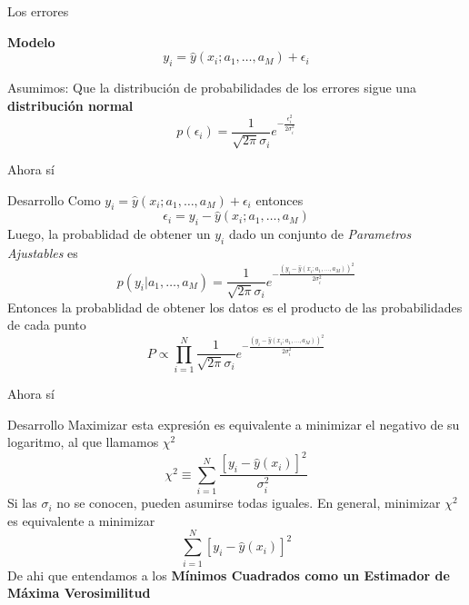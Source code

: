 \documentclass[11pt]{beamer}
\begin{document}
\begin{frame}{Los errores}

\begin{block}{\textbf{Modelo}}
\begin{equation}
y_i = \hat{y}(x_i;a_1,\dots,a_M) + \epsilon_i
\end{equation}
\end{block}
\begin{block}{Asumimos:}
Que la distribución de probabilidades de los errores sigue una \textbf{distribución normal}
\begin{equation}
p(\epsilon_i)=\frac{1}{\sqrt{2\pi}\sigma_i}e^{-\frac{\epsilon_i^2}{2\sigma_i^2}}
\end{equation}
\end{block}

\end{frame}

\begin{frame}{Ahora sí}
\begin{block}{Desarrollo}
Como $y_i = \hat{y}(x_i;a_1,\dots,a_M) + \epsilon_i$ entonces 
$$\epsilon_i = y_i - \hat{y}(x_i;a_1,\dots,a_M)$$
Luego, la probablidad de obtener un $y_i$ dado un conjunto de \textit{Parametros Ajustables} es 
$$ p(y_i|a_1,\dots,a_M)=\frac{1}{\sqrt{2\pi}\sigma_i}e^{-\frac{(y_i - \hat{y}(x_i;a_1,\dots,a_M))^2}{2\sigma_i^2}} $$
Entonces la probablidad de obtener los datos es el producto de las probabilidades de cada punto
$$ P \propto \prod_{i=1}^{N} \frac{1}{\sqrt{2\pi}\sigma_i}e^{-\frac{(y_i - \hat{y}(x_i;a_1,\dots,a_M))^2}{2\sigma_i^2}} $$
\end{block}
\end{frame}

\begin{frame}{Ahora sí}
\begin{block}{Desarrollo}
Maximizar esta expresión es equivalente a minimizar el negativo de su logaritmo, al que llamamos $\chi^2$
$$ \chi^2 \equiv \sum_{i=1}^{N} \frac{[y_i - \hat{y}(x_i)]^2}{\sigma_i^2} $$
Si las $\sigma_i$ no se conocen, pueden asumirse todas iguales. En general, minimizar $\chi^2$ es equivalente a minimizar 
$$ \sum_{i=1}^{N} [y_i - \hat{y}(x_i)]^2 $$
De ahi que entendamos a los \textbf{Mínimos Cuadrados como un Estimador de Máxima Verosimilitud}
\end{block}
\end{frame}
\end{document}
